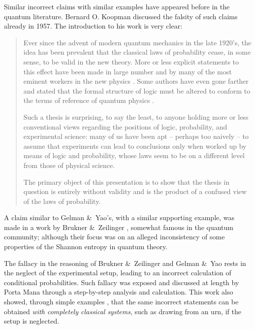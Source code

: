 \documentclass[\ifafour a4paper,12pt,\else a5paper,10pt,\fi%
onecolumn,oneside,article,%
british%
]{memoir}
\theoremstyle{remark}
\theoremstyle{innote}
\newcommand*{\citey}{\parencites*}
\newcommand*{\amp}{\&}
\renewcommand*{\|}[1][]{\nonscript\,#1\vert\nonscript\;\mathopen{}}
\newcommand*{\sect}{\S}%
\begin{document}
Similar incorrect claims with similar examples have appeared before in the
quantum literature. Bernard O. Koopman \parencite[of the Pitman-Koopman
theorem for sufficient statistics,]{koopman1936,pitman1936} discussed the
falsity of such claims already in 1957. The introduction to his work
\parencite{koopman1957} is very clear:
\begin{quotation}\footnotesize
  Ever since the advent of modern quantum mechanics in the late
  1920's, the idea has been prevalent that the classical laws of
  probability cease, in some sense, to be valid in the new theory. More or
  less explicit statements to this effect have been made in large number
  and by many of the most eminent workers in the new physics \textelp{}.
  Some authors have even gone farther and stated that the formal structure
  of logic must be altered to conform to the terms of reference of quantum
  physics \textelp{}.

  Such a thesis is surprising, to say the least, to anyone holding more or
  less conventional views regarding the positions of logic, probability,
  and experimental science: many of us have been apt -- perhaps too naively
  -- to assume that experiments can lead to conclusions only when worked up
  by means of logic and probability, whose laws seem to be on a different
  level from those of physical science.

  The primary object of this presentation is to show that the thesis in
  question is entirely without validity and is the product of a confused
  view of the laws of probability.
\end{quotation}

A claim similar to Gelman \amp\ Yao's, with a similar supporting example,
was made in a work by Brukner \amp\ Zeilinger \citey{brukneretal2001},
somewhat famous in the quantum community; although their focus was on an
alleged inconsistency of some properties of the Shannon entropy in quantum
theory.

The fallacy in the reasoning of Brukner \amp\ Zeilinger and Gelman \amp\
Yao rests in the neglect of the experimental setup, leading to an incorrect
calculation of conditional probabilities. Such fallacy was exposed and
discussed at length by Porta Mana \citey{portamana2003_r2004} through a
step-by-step analysis and calculation. This work also showed, through
simple examples \parencite[\sect~IV]{portamana2003_r2004}, that the same
incorrect statements can be obtained \emph{with completely classical
  systems}, such as drawing from an urn, if the setup is neglected.
\end{document}
